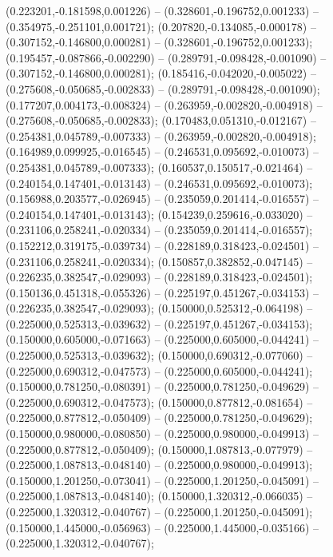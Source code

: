  (0.223201,-0.181598,0.001226) -- (0.328601,-0.196752,0.001233) -- (0.354975,-0.251101,0.001721);
 (0.207820,-0.134085,-0.000178) -- (0.307152,-0.146800,0.000281) -- (0.328601,-0.196752,0.001233);
 (0.195457,-0.087866,-0.002290) -- (0.289791,-0.098428,-0.001090) -- (0.307152,-0.146800,0.000281);
 (0.185416,-0.042020,-0.005022) -- (0.275608,-0.050685,-0.002833) -- (0.289791,-0.098428,-0.001090);
 (0.177207,0.004173,-0.008324) -- (0.263959,-0.002820,-0.004918) -- (0.275608,-0.050685,-0.002833);
 (0.170483,0.051310,-0.012167) -- (0.254381,0.045789,-0.007333) -- (0.263959,-0.002820,-0.004918);
 (0.164989,0.099925,-0.016545) -- (0.246531,0.095692,-0.010073) -- (0.254381,0.045789,-0.007333);
 (0.160537,0.150517,-0.021464) -- (0.240154,0.147401,-0.013143) -- (0.246531,0.095692,-0.010073);
 (0.156988,0.203577,-0.026945) -- (0.235059,0.201414,-0.016557) -- (0.240154,0.147401,-0.013143);
 (0.154239,0.259616,-0.033020) -- (0.231106,0.258241,-0.020334) -- (0.235059,0.201414,-0.016557);
 (0.152212,0.319175,-0.039734) -- (0.228189,0.318423,-0.024501) -- (0.231106,0.258241,-0.020334);
 (0.150857,0.382852,-0.047145) -- (0.226235,0.382547,-0.029093) -- (0.228189,0.318423,-0.024501);
 (0.150136,0.451318,-0.055326) -- (0.225197,0.451267,-0.034153) -- (0.226235,0.382547,-0.029093);
 (0.150000,0.525312,-0.064198) -- (0.225000,0.525313,-0.039632) -- (0.225197,0.451267,-0.034153);
 (0.150000,0.605000,-0.071663) -- (0.225000,0.605000,-0.044241) -- (0.225000,0.525313,-0.039632);
 (0.150000,0.690312,-0.077060) -- (0.225000,0.690312,-0.047573) -- (0.225000,0.605000,-0.044241);
 (0.150000,0.781250,-0.080391) -- (0.225000,0.781250,-0.049629) -- (0.225000,0.690312,-0.047573);
 (0.150000,0.877812,-0.081654) -- (0.225000,0.877812,-0.050409) -- (0.225000,0.781250,-0.049629);
 (0.150000,0.980000,-0.080850) -- (0.225000,0.980000,-0.049913) -- (0.225000,0.877812,-0.050409);
 (0.150000,1.087813,-0.077979) -- (0.225000,1.087813,-0.048140) -- (0.225000,0.980000,-0.049913);
 (0.150000,1.201250,-0.073041) -- (0.225000,1.201250,-0.045091) -- (0.225000,1.087813,-0.048140);
 (0.150000,1.320312,-0.066035) -- (0.225000,1.320312,-0.040767) -- (0.225000,1.201250,-0.045091);
 (0.150000,1.445000,-0.056963) -- (0.225000,1.445000,-0.035166) -- (0.225000,1.320312,-0.040767);
